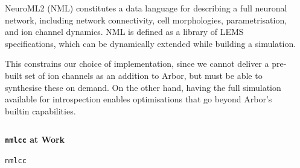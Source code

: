 \documentclass{beamer}
\begin{document}
\begin{frame}[t, fragile]
\begin{columns}
\begin{column}{0.49\textwidth}
      NeuroML2 (NML) constitutes a data language for describing a full neuronal
      network, including network connectivity, cell morphologies,
      parametrisation, and ion channel dynamics. NML is defined as a library of
      LEMS specifications, which can be dynamically extended while building a
      simulation.

      This constrains our choice of implementation, since we cannot deliver a
      pre-built set of ion channels as an addition to Arbor, but must be able to
      synthesise these on demand. On the other hand, having the full simulation
      available for introspection enables optimisations that go beyond Arbor's
      builtin capabilities.
    \end{column}
    \begin{column}{0.49\textwidth}

    \end{column}
  \end{columns}
  \vspace*{2ex}
  \begin{columns}
    \begin{column}{0.49\textwidth}
      \textbf{\texttt{nmlcc} at Work}

      \texttt{nmlcc}
    \end{column}
    \begin{column}{0.49\textwidth}

    \end{column}
  \end{columns}

\end{frame}
\end{document}
